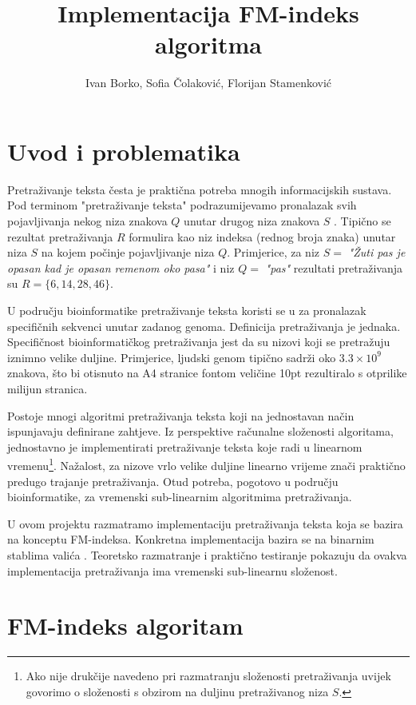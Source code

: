 \documentclass[times, utf8, seminar, numeric]{fer}
\title{Implementacija FM-indeks algoritma}
\author{Ivan Borko, Sofia Čolaković, Florijan Stamenković}
\begin{document}
\maketitle

\tableofcontents

\chapter{Uvod i problematika}

Pretraživanje teksta česta je praktična potreba mnogih informacijskih sustava.
Pod terminom "pretraživanje teksta" podrazumijevamo pronalazak svih pojavljivanja
nekog niza znakova $Q$  unutar drugog niza znakova $S$ .
Tipično se rezultat pretraživanja $R$
formulira kao niz indeksa (rednog broja znaka) unutar niza $S$ na kojem počinje pojavljivanje
niza $Q$. Primjerice, za niz $S =$ \textit{"Žuti pas je opasan kad je opasan remenom oko pasa"}
i niz $Q =$ \textit{"pas"} rezultati
pretraživanja su $R = \{6, 14, 28, 46\}$.

U području bioinformatike pretraživanje teksta koristi se u za pronalazak
specifičnih sekvenci unutar zadanog genoma. Definicija pretraživanja je jednaka. Specifičnost
bioinformatičkog pretraživanja jest da su nizovi koji se pretražuju iznimno velike duljine.
Primjerice, ljudski genom tipično sadrži oko $3.3 \times 10^9$ znakova, što bi otisnuto na
A4 stranice fontom veličine 10pt rezultiralo s otprilike milijun stranica.

Postoje mnogi algoritmi pretraživanja teksta
koji na jednostavan način ispunjavaju definirane zahtjeve.
Iz perspektive računalne složenosti algoritama, jednostavno je implementirati pretraživanje
teksta koje radi u linearnom vremenu\footnote{Ako nije drukčije navedeno pri razmatranju složenosti pretraživanja
uvijek govorimo o složenosti s obzirom na duljinu pretraživanog niza $S$.}.
Nažalost, za nizove vrlo velike duljine linearno vrijeme
znači praktično predugo trajanje pretraživanja. Otud potreba, pogotovo u području bioinformatike,
za vremenski sub-linearnim algoritmima pretraživanja.

U ovom projektu razmatramo implementaciju pretraživanja teksta koja se bazira na konceptu
FM-indeksa. Konkretna implementacija bazira se na binarnim stablima valića .
Teoretsko razmatranje i praktično testiranje pokazuju da ovakva implementacija pretraživanja
ima vremenski sub-linearnu složenost.

\chapter{FM-indeks algoritam}
\end{document}
